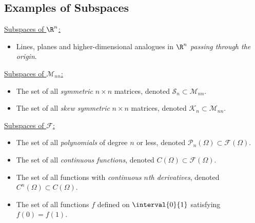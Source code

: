 \documentclass{article}
\begin{document}
\begin{multicols*}{3}
    \subsection{Examples of Subspaces}
    \underline{Subspaces of \(\R^n\):}
    \begin{itemize}[leftmargin=*,itemsep=-1ex,partopsep=1ex,parsep=1ex]
        \item Lines, planes and higher-dimensional analogues in \(\R^n\) \emph{passing through the origin}.
    \end{itemize}
    \underline{Subspaces of \(\mathscr{M}_{nn}\):}
    \begin{itemize}[leftmargin=*,itemsep=-1ex,partopsep=1ex,parsep=1ex]
        \item The set of all \emph{symmetric} \(n \times n\) matrices, denoted \(\mathscr{S}_n \subset \mathscr{M}_{nn}\).
        \item The set of all \emph{skew symmetric} \(n \times n\) matrices, denoted \(\mathscr{K}_n \subset \mathscr{M}_{nn}\).
    \end{itemize}
    \underline{Subspaces of \(\mathscr{F}\):}
    \begin{itemize}[leftmargin=*,itemsep=-1ex,partopsep=1ex,parsep=1ex]
        \item The set of all \emph{polynomials} of degree \(n\) or less, denoted \(\mathscr{P}_n\left( \Omega \right) \subset \mathscr{F}\left( \Omega \right)\).
        \item The set of all \emph{continuous functions}, denoted \(C\left( \Omega \right) \subset \mathscr{F}\left( \Omega \right)\).
        \item The set of all functions with \emph{continuous \(n\)th derivatives}, denoted \(C^n\left( \Omega \right) \subset C\left( \Omega \right)\).
        \item The set of all functions \(f\) defined on \(\interval{0}{1}\) satisfying \(f\left( 0 \right) = f\left( 1 \right)\).
    \end{itemize}

\end{multicols*}
\end{document}
